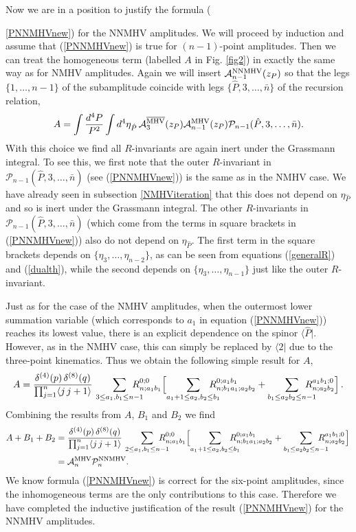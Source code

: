 \documentclass[12pt]{article}
\def \be  {\begin{equation}}
\def \ee  {\end{equation}}
\newcommand \widebar [1] {\overline{#1}}
\begin{document}
Now we are in a position to justify the formula ({\ref{PNNMHVnew}) for the NNMHV amplitudes. We will proceed by induction and assume that (\ref{PNNMHVnew}) is true for $(n-1)$-point amplitudes. Then we can treat the homogeneous term (labelled $A$ in Fig. \ref{fig2}) in exactly the same way as for NMHV amplitudes. Again we will insert $\mathcal{A}^{\rm NNMHV}_{n-1}(z_P)$ so that the legs $\{ 1,\ldots,n-1 \}$ of the subamplitude coincide with legs $\{ \hat{P},3,\ldots,\bar{n} \}$ of the recursion relation, 
\be
A = \int
\frac{d^{4}P}{P^2} \int d^{4} \eta_{\hat{P}} \,
\mathcal{A}_{3}^{\rm \widebar{MHV}}(z_{P}) \mathcal{A}_{n-1}^{\rm
MHV}(z_{P}) \mathcal{P}_{n-1}(\hat{P},3,\ldots,\bar{n}).
\ee
With this choice we find all $R$-invariants are again inert under the Grassmann integral. To see this, we first note that the outer $R$-invariant in $\mathcal{P}_{n-1}(\hat{P},3,\ldots,\bar{n})$ (see (\ref{PNNMHVnew})) is the same as in the NMHV case. We have already seen in subsection \ref{NMHViteration} that this does not depend on $\eta_{\hat{P}}$ and so is inert under the Grassmann integral. The other $R$-invariants in $\mathcal{P}_{n-1}(\hat{P},3,\ldots,\bar{n})$ (which come from the terms in square brackets in (\ref{PNNMHVnew})) also do not depend on $\eta_{\hat{P}}$. The first term in the square brackets depends on $\{\eta_3,\ldots,\eta_{n-2} \}$, as can be seen from equations (\ref{generalR}) and (\ref{dualth}), while the second depends on $\{ \eta_{3},\ldots,\eta_{n-1} \}$ just like the outer $R$-invariant.

Just as for the case of the NMHV amplitudes, when the outermost lower summation variable (which corresponds to $a_1$ in equation (\ref{PNNMHVnew})) reaches its lowest value, there is an explicit dependence on the spinor $\langle \hat{P}|$. However, as in the NMHV case, this can simply be replaced by $\langle 2 |$ due to the three-point kinematics. Thus we obtain the following simple result for $A$,
\be
A =  \frac{ \delta^{(4)}(p) \, \delta^{(8)}(q)}{\prod_{j=1}^{n} \langle j \, j+1 \rangle } \, \sum_{3\leq a_1,b_1 \leq n-1}
\!\!\!\!\!\!\!\! R_{n;a_1b_1}^{0;0} \Bigl[ \sum_{a_1+1 \leq a_2,b_2 \leq
 b_1} \!\!\!\!\!\!\!\! R_{n;b_1a_1;a_2b_2}^{0;a_1b_1}
 +  \sum_{b_1 \leq a_2b_2 \leq n-1} \!\!\!\!\!\!\!\! R_{n;a_2b_2}^{a_1b_1;0} \Bigr]\,.
\ee
Combining the results from $A$, $B_1$ and $B_2$ we find
\begin{align}
A + B_1 + B_2  &= \frac{ \delta^{(4)}(p) \, \delta^{(8)}(q)}{\prod_{j=1}^{n} \langle j \, j+1 \rangle } \, \sum_{2\leq a_1,b_1 \leq n-1}
\!\!\!\!\!\!\!\! R_{n;a_1b_1}^{0;0} \Bigl[ \sum_{a_1+1 \leq a_2,b_2 \leq
 b_1} \!\!\!\!\!\!\!\! R_{n;b_1a_1;a_2b_2}^{0;a_1b_1}
 +  \sum_{b_1 \leq a_2b_2 \leq n-1} \!\!\!\!\!\!\!\! R_{n;a_2b_2}^{a_1b_1;0} \Bigr]\, \notag\\
&= \mathcal{A}^{\rm MHV}_n \mathcal{P}^{\rm NNMHV}_n.
\end{align}
We know formula (\ref{PNNMHVnew}) is correct for the six-point amplitudes, since the inhomogeneous terms are the only contributions to this case. Therefore we have completed the inductive justification of the result (\ref{PNNMHVnew}) for the NNMHV amplitudes.



}
\end{document}
